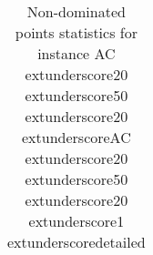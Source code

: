 \begin{table}
\caption{Non-dominated points statistics for instance AC	extunderscore20	extunderscore50	extunderscore20	extunderscoreAC	extunderscore20	extunderscore50	extunderscore20	extunderscore1	extunderscoredetailed}
\label{tab:stats/AC_20_50_20_AC_20_50_20_1_detailed}
\begin{tabular}{}
\toprule
\midrule
\bottomrule
\end{tabular}
\end{table}
